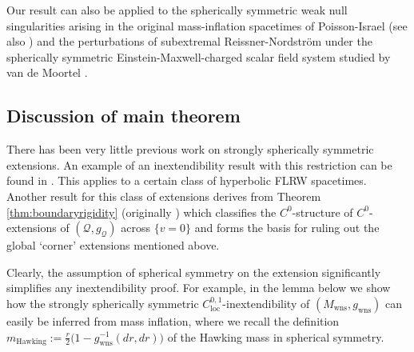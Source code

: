\documentclass{article}
\newcommand{\Q}{\mathcal{Q}}
\newcommand{\loc}{\mathrm{loc}}
\newcommand{\Mw}{M_{\mathrm{wns}}}
\newcommand{\gw}{g_{\mathrm{wns}}}
\begin{document}
Our result can also be applied to the spherically symmetric weak null singularities arising in the original mass-inflation spacetimes of Poisson-Israel \cite{Poisson:1989zz, Poisson:1990eh} (see also \cite{Ori:1991zz}) and the perturbations of subextremal Reissner-Nordstr\"om under the spherically symmetric Einstein-Maxwell-charged scalar field system studied by van de Moortel \cite{Vdm18, VdM21, VdM23}.




\subsection{Discussion of main theorem}

There has been very little previous work on strongly spherically symmetric extensions. An example of an inextendibility result with this restriction can be found in \cite{GalLin16}. This applies to a certain class of hyperbolic FLRW spacetimes. Another result for this class of extensions derives from Theorem \ref{thm:boundaryrigidity} (originally \cite[Theorem 4.3]{CameronSbierski}) which classifies the $C^0$-structure of $C^0$-extensions of $(\Q,g_\Q)$ across $\{v=0\}$ and forms the basis for ruling out the global `corner' extensions mentioned above. 

Clearly, the assumption of spherical symmetry on the extension significantly simplifies any inextendibility proof. For example, in the lemma below we show how the strongly spherically symmetric $C^{0,1}_{\loc}$-inextendibility of $(\Mw,\gw)$ can easily be inferred from mass inflation, where we recall the definition $m_{\mathrm{Hawking}} := \frac{r}{2}\big(1 - g_{\mathrm{wns}}^{-1}(dr,dr)\big)$ of the Hawking mass in spherical symmetry.
\end{document}
